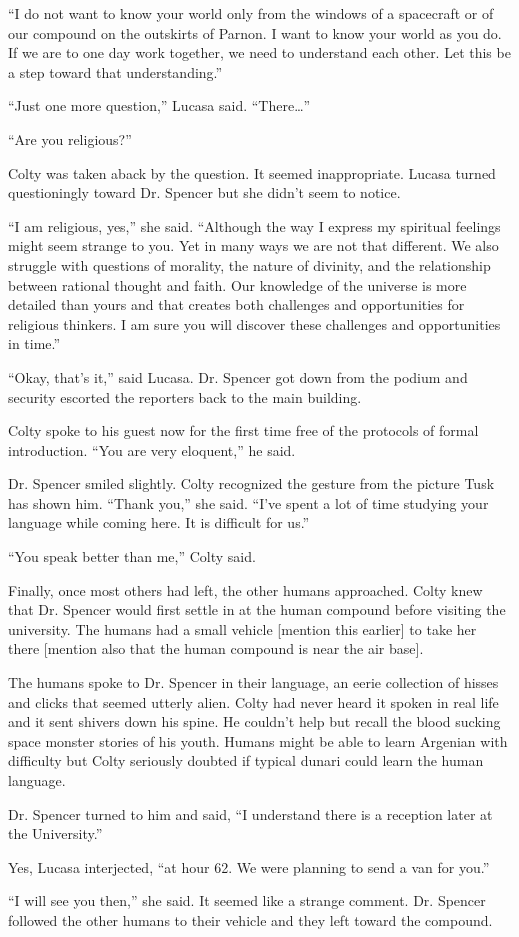 ``I do not want to know your world only from the windows of a spacecraft or of our compound on
the outskirts of Parnon. I want to know your world as you do. If we are to one day work
together, we need to understand each other. Let this be a step toward that understanding.''

``Just one more question,'' Lucasa said. ``There\ldots''

``Are you religious?''

Colty was taken aback by the question. It seemed inappropriate. Lucasa turned questioningly
toward Dr. Spencer but she didn't seem to notice.

``I am religious, yes,'' she said. ``Although the way I express my spiritual feelings might seem
strange to you. Yet in many ways we are not that different. We also struggle with questions of
morality, the nature of divinity, and the relationship between rational thought and faith. Our
knowledge of the universe is more detailed than yours and that creates both challenges and
opportunities for religious thinkers. I am sure you will discover these challenges and
opportunities in time.''

``Okay, that's it,'' said Lucasa. Dr. Spencer got down from the podium and security escorted the
reporters back to the main building.

Colty spoke to his guest now for the first time free of the protocols of formal introduction.
``You are very eloquent,'' he said.

Dr. Spencer smiled slightly. Colty recognized the gesture from the picture Tusk has shown him.
``Thank you,'' she said. ``I've spent a lot of time studying your language while coming here. It
is difficult for us.''

``You speak better than me,'' Colty said.

Finally, once most others had left, the other humans approached. Colty knew that Dr. Spencer
would first settle in at the human compound before visiting the university. The humans had a
small vehicle [mention this earlier] to take her there [mention also that the human compound is
near the air base].

The humans spoke to Dr. Spencer in their language, an eerie collection of hisses and clicks that
seemed utterly alien. Colty had never heard it spoken in real life and it sent shivers down his
spine. He couldn't help but recall the blood sucking space monster stories of his youth. Humans
might be able to learn Argenian with difficulty but Colty seriously doubted if typical dunari
could learn the human language.

Dr. Spencer turned to him and said, ``I understand there is a reception later at the
University.''

Yes, Lucasa interjected, ``at hour 62. We were planning to send a van for you.''

``I will see you then,'' she said. It seemed like a strange comment. Dr. Spencer followed the
other humans to their vehicle and they left toward the compound.
